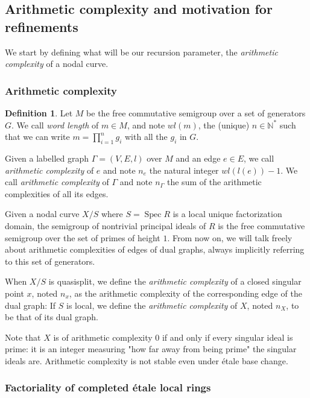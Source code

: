 \documentclass[a4paper,12pt]{amsart} %
\numberwithin{equation}{subsection}
\def\NN{\mathbb N}
\newcommand{\Spec}{\operatorname{Spec}}
\theoremstyle{definition}
\newtheorem{definition}{Definition}[section]
\theoremstyle{plain}%
\theoremstyle{remark}
\begin{document}
\subsection{Arithmetic complexity and motivation for refinements}
 We start by defining what will be our recursion parameter, the \emph{arithmetic complexity} of a nodal curve.

\subsubsection{Arithmetic complexity}

\begin{definition}\label{complexité arithmétique}
	Let $M$ be the free commutative semigroup over a set of generators $G$. We call \emph{word length} of $m\in M$, and note $wl(m)$, the (unique) $n\in\NN^*$ such that we can write $m=\prod\limits_{i=1}^n g_i$ with all the $g_i$ in $G$.
	
	Given a labelled graph $\Gamma=(V,E,l)$ over $M$ and an edge $e\in E$, we call \emph{arithmetic complexity} of $e$ and note $n_e$ the natural integer $wl(l(e))-1$. We call \emph{arithmetic complexity} of $\Gamma$ and note $n_\Gamma$ the sum of the arithmetic complexities of all its edges.

	Given a nodal curve $X/S$ where $S=\Spec R$ is a local unique factorization domain, the semigroup of nontrivial principal ideals of $R$ is the free commutative semigroup over the set of primes of height $1$. From now on, we will talk freely about arithmetic complexities of edges of dual graphs, always implicitly referring to this set of generators.
	
	When $X/S$ is quasisplit, we define the \emph{arithmetic complexity} of a closed singular point $x$, noted $n_x$, as the arithmetic complexity of the corresponding edge of the dual graph: If $S$ is local, we define the \emph{arithmetic complexity} of $X$, noted $n_X$, to be that of its dual graph.
	
	Note that $X$ is of arithmetic complexity $0$ if and only if every singular ideal is prime: it is an integer measuring "how far away from being prime" the singular ideals are. Arithmetic complexity is not stable even under \'etale base change.
\end{definition}

\subsubsection{Factoriality of completed \'etale local rings}
\end{document}
